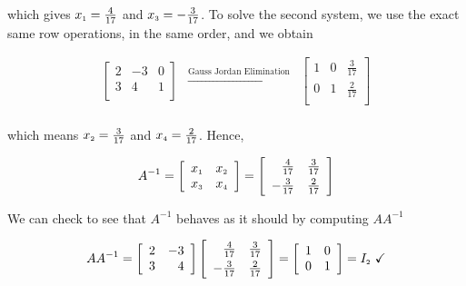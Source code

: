 \documentclass{ximera}
\begin{document}
which gives $x_{\mbox{\tiny$1$}} =  \frac{4}{17}$ and $x_{\mbox{\tiny$3$}} = -\frac{3}{17}$.  To solve the second system, we use the exact same row operations, in the same order, and we obtain

\[ \begin{array}{ccc}

\left[ \begin{array}{rr|r} 2 & -3 & 0 \\ 3 & 4 & 1 \\ \end{array} \right] 
&
\xrightarrow{\text{Gauss Jordan Elimination}}

&
\left[ \begin{array}{rr|r} 1 & 0 & \frac{3}{17} \\[3pt] 0 & 1 & \frac{2}{17} \\ \end{array} \right] \\

\end{array}\]

which means $x_{\mbox{\tiny$2$}} = \frac{3}{17}$ and $x_{\mbox{\tiny$4$}} = \frac{2}{17}$.  Hence, 

\[  A^{-1} = \left[ \begin{array}{rr} x_{\mbox{\tiny$1$}} & x_{\mbox{\tiny$2$}} \\ x_{\mbox{\tiny$3$}} & x_{\mbox{\tiny$4$}} \\ \end{array} \right] = \left[ \begin{array}{rr} \frac{4}{17} & \frac{3}{17} \\[3pt]  -\frac{3}{17} & \frac{2}{17} \\ \end{array} \right]   \]

We can check to see that $A^{-1}$ behaves as it should by computing $AA^{-1}$

\[ AA^{-1} = \left[ \begin{array}{rr} 2 & -3 \\ 3 & 4 \\ \end{array} \right] \left[ \begin{array}{rr} \frac{4}{17} & \frac{3}{17} \\[3pt]  -\frac{3}{17} & \frac{2}{17} \\ \end{array} \right] = \left[ \begin{array}{rr} 1 & 0 \\ 0 & 1 \\ \end{array} \right] = I_{\mbox{\tiny$2$}} \, \, \checkmark\]
\end{document}
